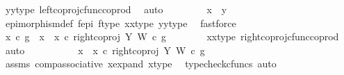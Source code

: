 \begin{isabellebody}
\ y{}{\isacharunderscore}{\kern0pt}y{}{\isacharunderscore}{\kern0pt}type\ left{\isacharunderscore}{\kern0pt}coproj{\isacharunderscore}{\kern0pt}cfunc{\isacharunderscore}{\kern0pt}coprod\ \isamarkupfalse%
\ auto\ \isanewline
\ \ \ \ \isamarkupfalse%
\ \isamarkupfalse%
\ {\isachardoublequoteopen}x{}\ {\isacharequal}{\kern0pt}\ y{}{\isachardoublequoteclose}\isanewline
\ \ \ \ \ \ \isamarkupfalse%
\ epimorphism{\isacharunderscore}{\kern0pt}def{}\ f{\isacharunderscore}{\kern0pt}epi\ f{\isacharunderscore}{\kern0pt}type\ x{}{\isacharunderscore}{\kern0pt}x{}{\isacharunderscore}{\kern0pt}type{\isacharparenleft}{\kern0pt}{}{\isacharparenright}{\kern0pt}\ y{}{\isacharunderscore}{\kern0pt}y{}{\isacharunderscore}{\kern0pt}type{\isacharparenleft}{\kern0pt}{}{\isacharparenright}{\kern0pt}\ \isamarkupfalse%
\ fastforce\isanewline
\ \ \isamarkupfalse%
\isanewline
\ \ \ \ \isamarkupfalse%
\ {\isachardoublequoteopen}x{}\ {\isasymcirc}\isactrlsub c\ g\ {\isacharequal}{\kern0pt}\ {\isacharparenleft}{\kern0pt}{\isacharparenleft}{\kern0pt}x{}\ {\isasymamalg}\ x{}{\isacharparenright}{\kern0pt}\ {\isasymcirc}\isactrlsub c\ right{\isacharunderscore}{\kern0pt}coproj\ Y\ W{\isacharparenright}{\kern0pt}\ {\isasymcirc}\isactrlsub c\ g{\isachardoublequoteclose}\isanewline
\ \ \ \ \ \ \isamarkupfalse%
\ x{}{\isacharunderscore}{\kern0pt}x{}{\isacharunderscore}{\kern0pt}type\ right{\isacharunderscore}{\kern0pt}coproj{\isacharunderscore}{\kern0pt}cfunc{\isacharunderscore}{\kern0pt}coprod\ \isamarkupfalse%
\ auto\ \isanewline
\ \ \ \ \isamarkupfalse%
\ \isamarkupfalse%
\ {\isachardoublequoteopen}{\isachardot}{\kern0pt}{\isachardot}{\kern0pt}{\isachardot}{\kern0pt}\ {\isacharequal}{\kern0pt}\ {\isacharparenleft}{\kern0pt}x{}\ {\isasymamalg}\ x{}{\isacharparenright}{\kern0pt}\ {\isasymcirc}\isactrlsub c\ right{\isacharunderscore}{\kern0pt}coproj\ Y\ W\ {\isasymcirc}\isactrlsub c\ g{\isachardoublequoteclose}\isanewline
\ \ \ \ \ \ \isamarkupfalse%
\ assms\ comp{\isacharunderscore}{\kern0pt}associative{}\ x{\isacharunderscore}{\kern0pt}expand\ x{\isacharunderscore}{\kern0pt}type\ \isamarkupfalse%
\ {\isacharparenleft}{\kern0pt}typecheck{\isacharunderscore}{\kern0pt}cfuncs{\isacharcomma}{\kern0pt}\ auto{\isacharparenright}{\kern0pt}\isanewline

\end{isabellebody}
